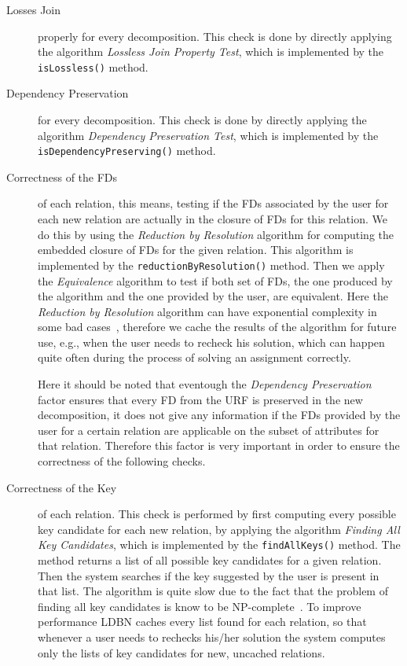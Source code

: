 \begin{description}
	\item [Losses Join] properly for every decomposition. This check is done by directly applying the 
		algorithm \textit{Lossless Join Property Test}, which is 
		implemented by the \verb=isLossless()= method.
		
	\item [Dependency Preservation] for every decomposition. This check is done by directly applying the 
		algorithm \textit{Dependency Preservation Test}, which is implemented by the 
		\verb=isDependencyPreserving()= method.
		
	\item [Correctness of the FDs] of each relation, this means, testing if the FDs associated by the user
		for each new relation are actually in the closure of FDs for this relation. We do this by
		using the \textit{Reduction by Resolution} algorithm for computing the embedded closure of FDs for the given
		relation. This algorithm is implemented by the \verb=reductionByResolution()= method. Then we apply
		the \textit{Equivalence} algorithm to test if both set of FDs, the one produced by 
		the algorithm and the one provided by the user, are equivalent. Here the \textit{Reduction by Resolution}
		algorithm can have exponential complexity in some bad cases~\cite{p4}, therefore we cache the results
		of the algorithm for future use, e.g., when the user needs to recheck his solution, which can happen
		quite often during the process of solving an assignment correctly. 
		
		Here it should be noted that
		eventough the \textit{Dependency Preservation} factor ensures that every FD from the URF is preserved
		in the new decomposition, it does not give any information if the FDs provided by the user 
		for a certain relation are
		applicable on the subset of attributes for that relation. Therefore this factor is very important 
		in order to ensure the correctness of the following checks. 
		
	\item [Correctness of the Key] of each relation. This check is performed by first computing 
		every possible key candidate
		for each new relation, by applying the algorithm \textit{Finding All Key Candidates}, 
		which is implemented
		by the \verb=findAllKeys()= method. The method returns a list of all possible key candidates
		for a given relation. Then the system searches if the key suggested by the user is 
		present in that list. The algorithm is quite slow due to the fact that the problem of
		finding all key candidates is know to be NP-complete~\cite{p3}. To improve performance LDBN
		caches every list found for each relation, so that whenever a user needs to rechecks his/her solution
		the system computes only the lists of key candidates for new, uncached relations.  
		

\end{description}

